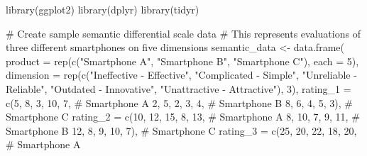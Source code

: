 \documentclass[
  letterpaper,
  DIV=11,
  numbers=noendperiod]{scrartcl}
\newenvironment{Shaded}{\begin{snugshade}}{\end{snugshade}}
\newcommand{\AttributeTok}[1]{\textcolor[rgb]{0.40,0.45,0.13}{#1}}
\newcommand{\CommentTok}[1]{\textcolor[rgb]{0.37,0.37,0.37}{#1}}
\newcommand{\DecValTok}[1]{\textcolor[rgb]{0.68,0.00,0.00}{#1}}
\newcommand{\FunctionTok}[1]{\textcolor[rgb]{0.28,0.35,0.67}{#1}}
\newcommand{\NormalTok}[1]{\textcolor[rgb]{0.00,0.23,0.31}{#1}}
\newcommand{\OtherTok}[1]{\textcolor[rgb]{0.00,0.23,0.31}{#1}}
\newcommand{\StringTok}[1]{\textcolor[rgb]{0.13,0.47,0.30}{#1}}
\begin{document}
\begin{Shaded}
\begin{Highlighting}[]
\FunctionTok{library}\NormalTok{(ggplot2)}
\FunctionTok{library}\NormalTok{(dplyr)}
\FunctionTok{library}\NormalTok{(tidyr)}

\CommentTok{\# Create sample semantic differential scale data}
\CommentTok{\# This represents evaluations of three different smartphones on five dimensions}
\NormalTok{semantic\_data }\OtherTok{\textless{}{-}} \FunctionTok{data.frame}\NormalTok{(}
  \AttributeTok{product =} \FunctionTok{rep}\NormalTok{(}\FunctionTok{c}\NormalTok{(}\StringTok{"Smartphone A"}\NormalTok{, }\StringTok{"Smartphone B"}\NormalTok{, }\StringTok{"Smartphone C"}\NormalTok{), }\AttributeTok{each =} \DecValTok{5}\NormalTok{),}
  \AttributeTok{dimension =} \FunctionTok{rep}\NormalTok{(}\FunctionTok{c}\NormalTok{(}\StringTok{"Ineffective {-} Effective"}\NormalTok{,}
                    \StringTok{"Complicated {-} Simple"}\NormalTok{,}
                    \StringTok{"Unreliable {-} Reliable"}\NormalTok{,}
                    \StringTok{"Outdated {-} Innovative"}\NormalTok{,}
                    \StringTok{"Unattractive {-} Attractive"}\NormalTok{), }\DecValTok{3}\NormalTok{),}
  \AttributeTok{rating\_1 =} \FunctionTok{c}\NormalTok{(}\DecValTok{5}\NormalTok{, }\DecValTok{8}\NormalTok{, }\DecValTok{3}\NormalTok{, }\DecValTok{10}\NormalTok{, }\DecValTok{7}\NormalTok{,       }\CommentTok{\# Smartphone A}
               \DecValTok{2}\NormalTok{, }\DecValTok{5}\NormalTok{, }\DecValTok{2}\NormalTok{, }\DecValTok{3}\NormalTok{, }\DecValTok{4}\NormalTok{,        }\CommentTok{\# Smartphone B}
               \DecValTok{8}\NormalTok{, }\DecValTok{6}\NormalTok{, }\DecValTok{4}\NormalTok{, }\DecValTok{5}\NormalTok{, }\DecValTok{3}\NormalTok{),       }\CommentTok{\# Smartphone C}
  \AttributeTok{rating\_2 =} \FunctionTok{c}\NormalTok{(}\DecValTok{10}\NormalTok{, }\DecValTok{12}\NormalTok{, }\DecValTok{15}\NormalTok{, }\DecValTok{8}\NormalTok{, }\DecValTok{13}\NormalTok{,    }\CommentTok{\# Smartphone A}
               \DecValTok{8}\NormalTok{, }\DecValTok{10}\NormalTok{, }\DecValTok{7}\NormalTok{, }\DecValTok{9}\NormalTok{, }\DecValTok{11}\NormalTok{,      }\CommentTok{\# Smartphone B}
               \DecValTok{12}\NormalTok{, }\DecValTok{8}\NormalTok{, }\DecValTok{9}\NormalTok{, }\DecValTok{10}\NormalTok{, }\DecValTok{7}\NormalTok{),     }\CommentTok{\# Smartphone C}
  \AttributeTok{rating\_3 =} \FunctionTok{c}\NormalTok{(}\DecValTok{25}\NormalTok{, }\DecValTok{20}\NormalTok{, }\DecValTok{22}\NormalTok{, }\DecValTok{18}\NormalTok{, }\DecValTok{20}\NormalTok{,   }\CommentTok{\# Smartphone A}

\end{Highlighting}
\end{Shaded}
\end{document}
